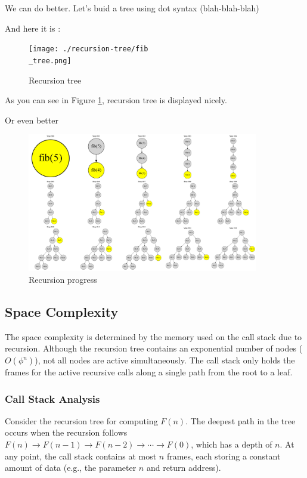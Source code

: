 \documentclass{article}
\begin{document}
We can do better. Let's buid a tree using dot syntax (blah-blah-blah)


And here it is : 
\begin{figure}[H] %
	\centering
	\texttt{[image: ./recursion-tree/fib\\\_tree.png]}
	\caption{Recursion tree} %
	\label{fig:logo} %
\end{figure}

\newpage
As you can see in Figure \ref{fig:logo}, recursion tree is displayed nicely.

Or even better
\begin{figure}[H]
	\centering
	\includegraphics[width=0.9\textwidth]{./recursion-tree-animation/png/recursion_tree_combined.png}
	\caption{Recursion progress}
	\label{fig:fib_steps_progress}
\end{figure}

\subsection{Space Complexity}
The space complexity is determined by the memory used on the call stack due to recursion. Although the recursion tree contains an exponential number of nodes (\( O(\phi^n) \)), not all nodes are active simultaneously. The call stack only holds the frames for the active recursive calls along a single path from the root to a leaf.

\subsubsection{Call Stack Analysis}
Consider the recursion tree for computing \( F(n) \). The deepest path in the tree occurs when the recursion follows \( F(n) \to F(n-1) \to F(n-2) \to \cdots \to F(0) \), which has a depth of \( n \). At any point, the call stack contains at most \( n \) frames, each storing a constant amount of data (e.g., the parameter \( n \) and return address).
\end{document}
